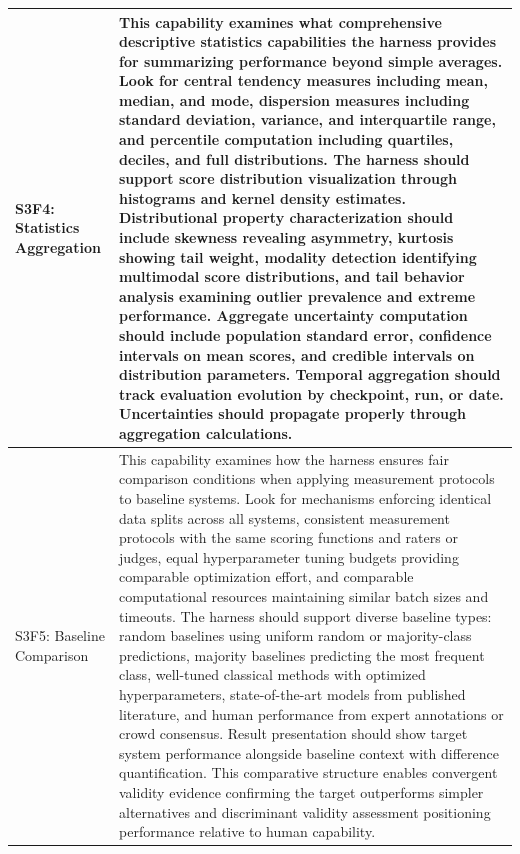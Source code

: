 \begin{longtable}{>{\raggedright\arraybackslash}p{3cm}|>{\raggedright\arraybackslash}p{16cm}}
S3F4: Statistics Aggregation & This capability examines what comprehensive descriptive statistics capabilities the harness provides for summarizing performance beyond simple averages. Look for central tendency measures including mean, median, and mode, dispersion measures including standard deviation, variance, and interquartile range, and percentile computation including quartiles, deciles, and full distributions. The harness should support score distribution visualization through histograms and kernel density estimates. Distributional property characterization should include skewness revealing asymmetry, kurtosis showing tail weight, modality detection identifying multimodal score distributions, and tail behavior analysis examining outlier prevalence and extreme performance. Aggregate uncertainty computation should include population standard error, confidence intervals on mean scores, and credible intervals on distribution parameters. Temporal aggregation should track evaluation evolution by checkpoint, run, or date. Uncertainties should propagate properly through aggregation calculations. \\
\hline

S3F5: Baseline Comparison & This capability examines how the harness ensures fair comparison conditions when applying measurement protocols to baseline systems. Look for mechanisms enforcing identical data splits across all systems, consistent measurement protocols with the same scoring functions and raters or judges, equal hyperparameter tuning budgets providing comparable optimization effort, and comparable computational resources maintaining similar batch sizes and timeouts. The harness should support diverse baseline types: random baselines using uniform random or majority-class predictions, majority baselines predicting the most frequent class, well-tuned classical methods with optimized hyperparameters, state-of-the-art models from published literature, and human performance from expert annotations or crowd consensus. Result presentation should show target system performance alongside baseline context with difference quantification. This comparative structure enables convergent validity evidence confirming the target outperforms simpler alternatives and discriminant validity assessment positioning performance relative to human capability. \\
\hline


\end{longtable}
